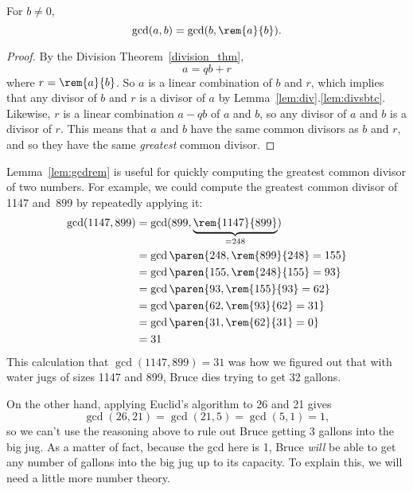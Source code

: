 \begin{lemma}\label{lem:gcdrem}
For $b \neq 0$,
\[
\gcd(a, b) = \gcd(b, \rem{a}{b}).
\]

\begin{proof}
By the Division Theorem~\ref{division_thm},
\begin{equation}\label{aqbrprf}
a = qb + r
\end{equation}
where $r = \rem{a}{b}$.  So $a$ is a linear combination of $b$ and
$r$, which implies that any divisor of $b$ and $r$ is a divisor of $a$
by Lemma~\ref{lem:div}.\ref{lem:divsbtc}.  Likewise, $r$ is a linear
combination $a-qb$ of $a$ and $b$, so any divisor of $a$ and $b$ is
a divisor of $r$.  This means that $a$ and $b$ have the same common
divisors as $b$ and $r$, and so they have the same \emph{greatest}
common divisor.
\end{proof}
\end{lemma}

Lemma~\ref{lem:gcdrem} is useful for quickly computing the greatest
common divisor of two numbers.  For example, we could compute the
greatest common divisor of 1147 and~899 by repeatedly applying it:
\begin{align*}
\gcd(1147, 899) &= \gcd(899, \underbrace{\rem{1147}{899}}_{{} = 248}) \\
&= \gcd\paren{248, \rem{899}{248} = 155} \\
&= \gcd\paren{155, \rem{248}{155} = 93} \\
&= \gcd\paren{ 93, \rem{155}{93} = 62}\\
&= \gcd\paren{ 62, \rem{93}{62} = 31} \\
&= \gcd\paren{ 31, \rem{62}{31} = 0} \\
&= 31
\end{align*}
This calculation that $\gcd(1147, 899) = 31$ was how we figured out
that with water jugs of sizes 1147 and 899, Bruce dies trying to get
32 gallons.

On the other hand, applying Euclid's algorithm to 26 and 21 gives
\[
\gcd(26, 21) = \gcd(21, 5) = \gcd(5, 1) = 1,
\]
so we can't use the reasoning above to rule out Bruce getting 3
gallons into the big jug.  As a matter of fact, because the gcd here
is 1, Bruce \emph{will} be able to get any number of gallons into the big jug
up to its capacity.  To explain this, we will need a little more
number theory.

